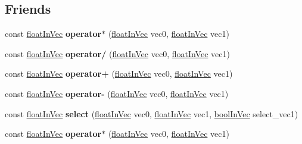 \subsection*{Friends}
\begin{DoxyCompactItemize}
\item 
\hypertarget{classVectormath_1_1floatInVec_a9f97436600c786a7cf4a6bbd847d48af}{const \hyperlink{classVectormath_1_1floatInVec}{float\-In\-Vec} {\bfseries operator$\ast$} (\hyperlink{classVectormath_1_1floatInVec}{float\-In\-Vec} vec0, \hyperlink{classVectormath_1_1floatInVec}{float\-In\-Vec} vec1)}\label{classVectormath_1_1floatInVec_a9f97436600c786a7cf4a6bbd847d48af}

\item 
\hypertarget{classVectormath_1_1floatInVec_a45425f8c4a644ad4e68a0f695f63feee}{const \hyperlink{classVectormath_1_1floatInVec}{float\-In\-Vec} {\bfseries operator/} (\hyperlink{classVectormath_1_1floatInVec}{float\-In\-Vec} vec0, \hyperlink{classVectormath_1_1floatInVec}{float\-In\-Vec} vec1)}\label{classVectormath_1_1floatInVec_a45425f8c4a644ad4e68a0f695f63feee}

\item 
\hypertarget{classVectormath_1_1floatInVec_af55f7e5d4004c1c539e4f6ec92ba0c62}{const \hyperlink{classVectormath_1_1floatInVec}{float\-In\-Vec} {\bfseries operator+} (\hyperlink{classVectormath_1_1floatInVec}{float\-In\-Vec} vec0, \hyperlink{classVectormath_1_1floatInVec}{float\-In\-Vec} vec1)}\label{classVectormath_1_1floatInVec_af55f7e5d4004c1c539e4f6ec92ba0c62}

\item 
\hypertarget{classVectormath_1_1floatInVec_aedff0079a93c6938cf4771e19091e6e3}{const \hyperlink{classVectormath_1_1floatInVec}{float\-In\-Vec} {\bfseries operator-\/} (\hyperlink{classVectormath_1_1floatInVec}{float\-In\-Vec} vec0, \hyperlink{classVectormath_1_1floatInVec}{float\-In\-Vec} vec1)}\label{classVectormath_1_1floatInVec_aedff0079a93c6938cf4771e19091e6e3}

\item 
\hypertarget{classVectormath_1_1floatInVec_a2861ac5749cb945d8d27afa055c9db17}{const \hyperlink{classVectormath_1_1floatInVec}{float\-In\-Vec} {\bfseries select} (\hyperlink{classVectormath_1_1floatInVec}{float\-In\-Vec} vec0, \hyperlink{classVectormath_1_1floatInVec}{float\-In\-Vec} vec1, \hyperlink{classVectormath_1_1boolInVec}{bool\-In\-Vec} select\-\_\-vec1)}\label{classVectormath_1_1floatInVec_a2861ac5749cb945d8d27afa055c9db17}

\item 
\hypertarget{classVectormath_1_1floatInVec_a9f97436600c786a7cf4a6bbd847d48af}{const \hyperlink{classVectormath_1_1floatInVec}{float\-In\-Vec} {\bfseries operator$\ast$} (\hyperlink{classVectormath_1_1floatInVec}{float\-In\-Vec} vec0, \hyperlink{classVectormath_1_1floatInVec}{float\-In\-Vec} vec1)}\label{classVectormath_1_1floatInVec_a9f97436600c786a7cf4a6bbd847d48af}


\end{DoxyCompactItemize}
